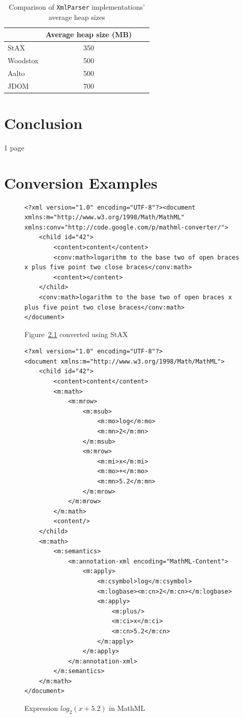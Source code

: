 \documentclass[11pt,oneside,final]{fithesis2}
\begin{document}
\begin{table}[!ht]
\centering
\begin{tabular}{|l|c|c|c|}
\hline
& Average heap size (MB) \\ \hline
\hline
StAX & 350 \\ \hline
Woodstox & 500 \\ \hline
Aalto & 500 \\ \hline
JDOM & 700 \\ \hline
\end{tabular}
\caption{Comparison of \texttt{XmlParser} implementations' average heap sizes}
\label{table:averageheap}
\end{table}

\chapter{Conclusion}
1 page

\clearpage
{}



\appendix
\chapter{Conversion Examples}
\label{appendix:conversionexamples}

\begin{figure}[!ht]
\lstset{language=XML,frame=lines}
\begin{lstlisting}
<?xml version="1.0" encoding="UTF-8"?><document xmlns:m="http://www.w3.org/1998/Math/MathML" xmlns:conv="http://code.google.com/p/mathml-converter/">
	<child id="42">
		<content>content</content>		
		<conv:math>logarithm to the base two of open braces x plus five point two close braces</conv:math>
		<content></content>
	</child>
	<conv:math>logarithm to the base two of open braces x plus five point two close braces</conv:math>
</document>
\end{lstlisting}
\caption{Figure~\ref{appendix:xml:example1} converted using StAX}
\end{figure}

\begin{figure}[!ht]
\lstset{language=XML,frame=lines}
\begin{lstlisting}
<?xml version="1.0" encoding="UTF-8"?>
<document xmlns:m="http://www.w3.org/1998/Math/MathML">
	<child id="42">
		<content>content</content>		
		<m:math>
			<m:mrow>
				<m:msub>
					<m:mo>log</m:mo>
					<m:mn>2</m:mn>
				</m:msub>
				<m:mrow>
					<m:mi>x</m:mi>
					<m:mo>+</m:mo>
					<m:mn>5.2</m:mn>
				</m:mrow>
			</m:mrow>			
		</m:math>
		<content/>
	</child>
	<m:math>
		<m:semantics>
			<m:annotation-xml encoding="MathML-Content">
				<m:apply>
					<m:csymbol>log</m:csymbol>
					<m:logbase><m:cn>2</m:cn></m:logbase>
					<m:apply>
						<m:plus/>
						<m:ci>x</m:ci>
						<m:cn>5.2</m:cn>
					</m:apply>
				</m:apply>
			</m:annotation-xml>
		</m:semantics>
	</m:math>
</document>
\end{lstlisting}
\caption{Expression $log_2 (x+5.2)$ in MathML}
\label{appendix:xml:example1}
\end{figure}
\end{document}
